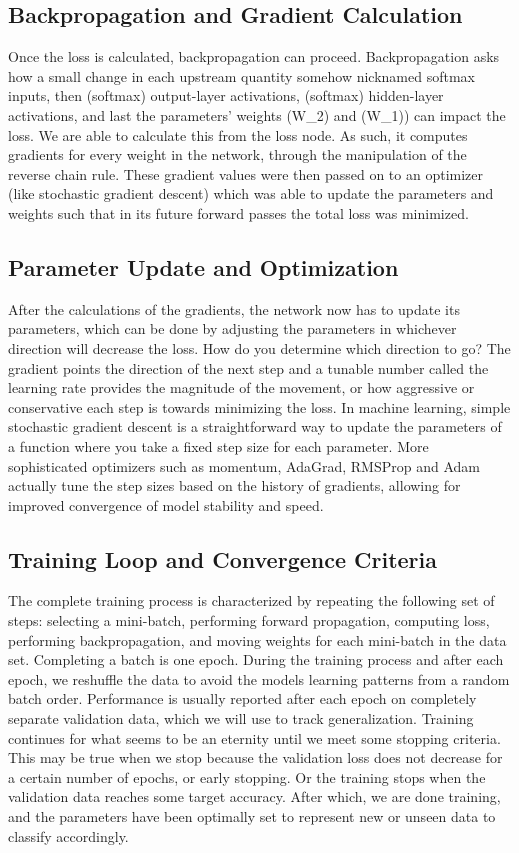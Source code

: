     \subsection{Backpropagation and Gradient Calculation}
    Once the loss is calculated, backpropagation can proceed. Backpropagation asks how a small change in each upstream quantity somehow nicknamed softmax inputs, then (softmax) output-layer activations, (softmax) hidden-layer activations, and last the parameters' weights (W\_2) and (W\_1)) can impact the loss. We are able to calculate this from the loss node. As such, it computes gradients for every weight in the network, through the manipulation of the reverse chain rule. These gradient values were then passed on to an optimizer (like stochastic gradient descent) which was able to update the parameters and weights such that in its future forward passes the total loss was minimized.

    
    \subsection{Parameter Update and Optimization}
    After the calculations of the gradients, the network now has to update its parameters, which can be done by adjusting the parameters in whichever direction will decrease the loss. How do you determine which direction to go? The gradient points the direction of the next step and a tunable number called the learning rate provides the magnitude of the movement, or how aggressive or conservative each step is towards minimizing the loss. In machine learning, simple stochastic gradient descent is a straightforward way to update the parameters of a function where you take a fixed step size for each parameter. More sophisticated optimizers such as momentum, AdaGrad, RMSProp and Adam actually tune the step sizes based on the history of gradients, allowing for improved convergence of model stability and speed.
    
    \subsection{Training Loop and Convergence Criteria}
    The complete training process is characterized by repeating the following set of steps: selecting a mini-batch, performing forward propagation, computing loss, performing backpropagation, and moving weights for each mini-batch in the data set. Completing a batch is one epoch. During the training process and after each epoch, we reshuffle the data to avoid the models learning patterns from a random batch order. Performance is usually reported after each epoch on completely separate validation data, which we will use to track generalization. Training continues for what seems to be an eternity until we meet some stopping criteria. This may be true when we stop because the validation loss does not decrease for a certain number of epochs, or early stopping. Or the training stops when the validation data reaches some target accuracy. After which, we are done training, and the parameters have been optimally set to represent new or unseen data to classify accordingly.
    
